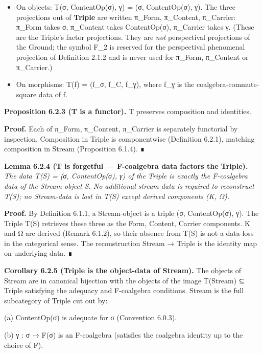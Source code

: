 \documentclass[11pt, openany]{book}
\begin{document}
\begin{itemize}
\item On objects: T(σ, ContentOp(σ), γ) = (σ, ContentOp(σ), γ). The three projections out of \textbf{Triple} are written π\_\allowbreak{}Form, π\_\allowbreak{}Content, π\_\allowbreak{}Carrier: π\_\allowbreak{}Form takes σ, π\_\allowbreak{}Content takes ContentOp(σ), π\_\allowbreak{}Carrier takes γ. (These are the Triple's factor projections. They are \textit{not} perspectival projections of the Ground; the symbol F\_\allowbreak{}2 is reserved for the perspectival phenomenal projection of Definition 2.1.2 and is never used for π\_\allowbreak{}Form, π\_\allowbreak{}Content or π\_\allowbreak{}Carrier.)
\item On morphisms: T(f) = (f\_\allowbreak{}σ, f\_\allowbreak{}C, f\_\allowbreak{}γ), where f\_\allowbreak{}γ is the coalgebra-commute-square data of f.
\end{itemize}

\textbf{Proposition 6.2.3 (T is a functor).} T preserves composition and identities.

\textbf{Proof.} Each of π\_\allowbreak{}Form, π\_\allowbreak{}Content, π\_\allowbreak{}Carrier is separately functorial by inspection. Composition in Triple is componentwise (Definition 6.2.1), matching composition in Stream (Proposition 6.1.4). ∎

\textbf{Lemma 6.2.4 (T is forgetful --- F-coalgebra data factors the Triple).} \textit{The data T(S) = (σ, ContentOp(σ), γ) of the Triple is exactly the F-coalgebra data of the Stream-object S. No additional stream-data is required to reconstruct T(S); no Stream-data is lost in T(S) except derived components (K, Ω).}

\textbf{Proof.} By Definition 6.1.1, a Stream-object is a triple (σ, ContentOp(σ), γ). The Triple T(S) retrieves these three as the Form, Content, Carrier components. K and Ω are derived (Remark 6.1.2), so their absence from T(S) is not a data-loss in the categorical sense. The reconstruction Stream → Triple is the identity map on underlying data. ∎

\textbf{Corollary 6.2.5 (Triple is the object-data of Stream).} The objects of Stream are in canonical bijection with the objects of the image T(Stream) ⊆ Triple satisfying the adequacy and F-coalgebra conditions. Stream is the full subcategory of Triple cut out by:

(a) ContentOp(σ) is adequate for σ (Convention 6.0.3).

(b) γ : σ → F(σ) is an F-coalgebra (satisfies the coalgebra identity up to the choice of F).
\end{document}
